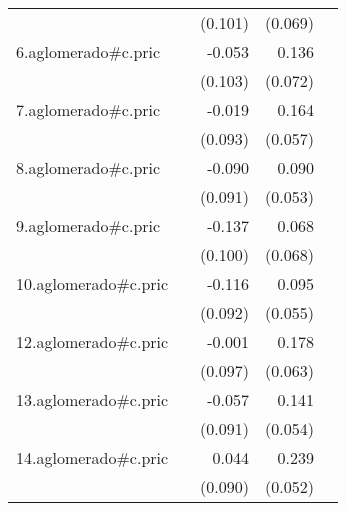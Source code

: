 {\begin{longtable}{l*{4}{D{.}{.}{-1}}}
            &                     &     (0.101)         &     (0.069)         &                     \\
\addlinespace
6.aglomerado#c.pric&                     &      -0.053         &       0.136         &                     \\
            &                     &     (0.103)         &     (0.072)         &                     \\
\addlinespace
7.aglomerado#c.pric&                     &      -0.019         &       0.164\sym{**} &                     \\
            &                     &     (0.093)         &     (0.057)         &                     \\
\addlinespace
8.aglomerado#c.pric&                     &      -0.090         &       0.090         &                     \\
            &                     &     (0.091)         &     (0.053)         &                     \\
\addlinespace
9.aglomerado#c.pric&                     &      -0.137         &       0.068         &                     \\
            &                     &     (0.100)         &     (0.068)         &                     \\
\addlinespace
10.aglomerado#c.pric&                     &      -0.116         &       0.095         &                     \\
            &                     &     (0.092)         &     (0.055)         &                     \\
\addlinespace
12.aglomerado#c.pric&                     &      -0.001         &       0.178\sym{**} &                     \\
            &                     &     (0.097)         &     (0.063)         &                     \\
\addlinespace
13.aglomerado#c.pric&                     &      -0.057         &       0.141\sym{**} &                     \\
            &                     &     (0.091)         &     (0.054)         &                     \\
\addlinespace
14.aglomerado#c.pric&                     &       0.044         &       0.239\sym{***}&                     \\
            &                     &     (0.090)         &     (0.052)         &                     \\

\end{longtable}}
